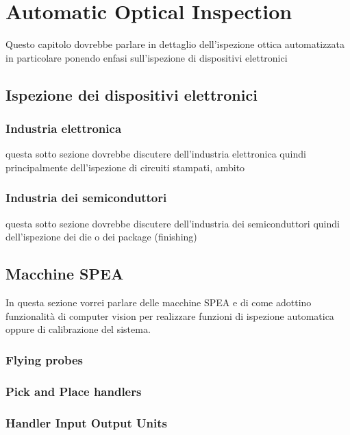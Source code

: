 \chapter{Automatic Optical Inspection}
Questo capitolo dovrebbe parlare in dettaglio dell'ispezione
ottica automatizzata in particolare ponendo enfasi sull'ispezione di
dispositivi elettronici
\section{Ispezione dei dispositivi elettronici}
\subsection{Industria elettronica}
questa sotto sezione dovrebbe discutere dell'industria elettronica
quindi principalmente dell'ispezione di circuiti stampati, ambito
\subsection{Industria dei semiconduttori}
questa sotto sezione dovrebbe discutere dell'industria dei semiconduttori
quindi dell'ispezione dei die o dei package (finishing) 
\section{Macchine SPEA}
In questa sezione vorrei parlare delle macchine SPEA e di come adottino
funzionalità di computer vision per realizzare funzioni di ispezione automatica
oppure di calibrazione del sistema.
\subsection{Flying probes}
\subsection{Pick and Place handlers}
\subsection{Handler Input Output Units}